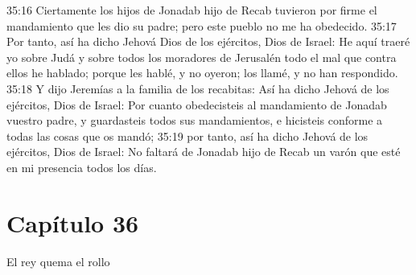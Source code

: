 35:16 Ciertamente los hijos de Jonadab hijo de Recab tuvieron por firme el mandamiento que les dio su padre; pero este pueblo no me ha obedecido. 
35:17 Por tanto, así ha dicho Jehová Dios de los ejércitos, Dios de Israel: He aquí traeré yo sobre Judá y sobre todos los moradores de Jerusalén todo el mal que contra ellos he hablado; porque les hablé, y no oyeron; los llamé, y no han respondido. 
35:18 Y dijo Jeremías a la familia de los recabitas: Así ha dicho Jehová de los ejércitos, Dios de Israel: Por cuanto obedecisteis al mandamiento de Jonadab vuestro padre, y guardasteis todos sus mandamientos, e hicisteis conforme a todas las cosas que os mandó; 
35:19 por tanto, así ha dicho Jehová de los ejércitos, Dios de Israel: No faltará de Jonadab hijo de Recab un varón que esté en mi presencia todos los días. 
\section*{Capítulo 36 }
El rey quema el rollo 
 
